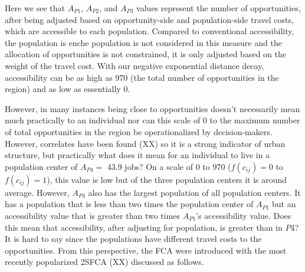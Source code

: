 \documentclass[]{elsarticle} %
\begin{document}
Here we see that \(A_{P1}\), \(A_{P2}\), and \(A_{P3}\) values represent
the number of opportunities, after being adjusted based on
opportunity-side and population-side travel costs, which are accessible
to each population. Compared to conventional accessibility, the
population is enche population is not considered in this measure and the
allocation of opportunities is not constrained, it is only adjusted
based on the weight of the travel cost. With our negative exponential
distance decay, accessibility can be as high as 970 (the total number of
opportunities in the region) and as low as essentially 0.

However, in many instances being close to opportunities doesn't
necessarily mean much practically to an individual nor can this scale of
0 to the maximum number of total opportunities in the region be
operationalized by decision-makers. However, correlates have been found
(XX) so it is a strong indicator of urban structure, but practically
what does it mean for an individual to live in a population center of
\(A_{P4} =\) 43.9 jobs? On a scale of 0 to 970 (\(f(c_{ij})=0\) to
\(f(c_{ij})=1\)), this value is low but of the three population centers
it is around average. However, \(A_{P4}\) also has the largest
population of all population centers. It has a population that is less
than two times the population center of \(A_{P1}\) but an accessibility
value that is greater than two times \(A_{P1}\)'s accessibility value.
Does this mean that accessibility, after adjusting for population, is
greater than in \(P4\)? It is hard to say since the populations have
different travel costs to the opportunities. From this perspective, the
FCA were introduced with the most recently popularized 2SFCA (XX)
discussed as follows.

\newpage

\renewcommand\refname{References}

\end{document}
